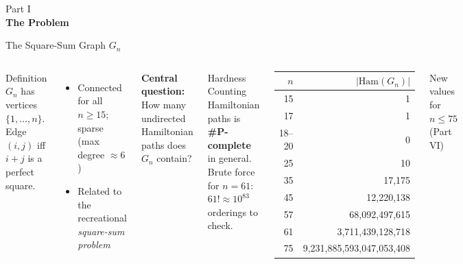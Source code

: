 \documentclass[aspectratio=169,t]{beamer}
\begin{document}
{
\begin{frame}[plain]
  \vspace{2cm}
  \begin{center}
    {\color{lightblue}\small Part I}\\[0.4cm]
    {\color{white}\LARGE\bfseries The Problem}
  \end{center}
\end{frame}
}

\begin{frame}{The Square-Sum Graph $G_n$}
\small
\begin{columns}[c]
\begin{block}{Definition}
$G_n$ has vertices $\{1,\ldots,n\}$. Edge $(i,j)$ iff $i+j$ is a perfect square.
\end{block}

\vspace{0.2cm}
\begin{itemize}
  \item Connected for all $n \ge 15$; sparse (max degree $\approx 6$)
  \item Related to the recreational \emph{square-sum problem}
\end{itemize}

\vspace{0.2cm}
\textbf{Central question:}
How many \alert{undirected Hamiltonian paths} does $G_n$ contain?

\vspace{0.2cm}
\begin{alertblock}{Hardness}
Counting Hamiltonian paths is \textbf{\#P-complete} in general.\\
Brute force for $n=61$: $61! \approx 10^{83}$ orderings to check.
\end{alertblock}

\begin{center}
\begin{tabular}{rr}
\toprule
$n$ & $|\mathrm{Ham}(G_n)|$ \\
\midrule
15 & 1 \\
17 & 1 \\
18--20 & 0 \\
25 & 10 \\
35 & 17{,}175 \\
45 & 12{,}220{,}138 \\
57 & 68{,}092{,}497{,}615 \\
61 & 3{,}711{,}439{,}128{,}718 \\
\rowcolor{dkgreen!15}
75 & 9{,}231{,}885{,}593{,}047{,}053{,}408 \\
\bottomrule
\end{tabular}
\end{center}
{\small\color{dkgreen} New values for $n\le 75$ (Part VI)}
\end{columns}
\end{frame}
\end{document}
